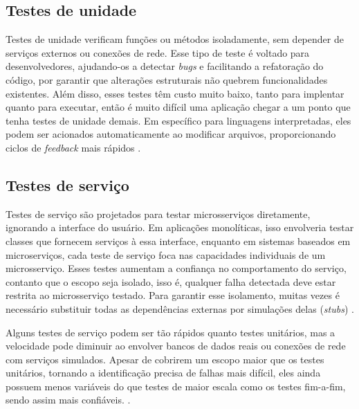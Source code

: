 
\subsection{Testes de unidade}
Testes de unidade verificam funções ou métodos isoladamente, sem depender de serviços externos ou conexões de rede. Esse tipo de teste é voltado para desenvolvedores, ajudando-os a detectar \emph{bugs} e facilitando a refatoração do código, por garantir que alterações estruturais não quebrem funcionalidades existentes. Além disso, esses testes têm custo muito baixo, tanto para implentar quanto para executar, então é muito difícil uma aplicação chegar a um ponto que tenha testes de unidade demais. Em específico para linguagens interpretadas, eles podem ser acionados automaticamente ao modificar arquivos, proporcionando ciclos de \emph{feedback} mais rápidos \cite{livro-building-microservices}. 

\subsection{Testes de serviço}
Testes de serviço são projetados para testar microsserviços diretamente, ignorando a interface do usuário. Em aplicações monolíticas, isso envolveria testar classes que fornecem serviços à essa interface, enquanto em sistemas baseados em microserviços, cada teste de serviço foca nas capacidades individuais de um microsserviço. Esses testes aumentam a confiança no comportamento do serviço, contanto que o escopo seja isolado, isso é, qualquer falha detectada deve estar restrita ao microsserviço testado. Para garantir esse isolamento, muitas vezes é necessário substituir todas as dependências externas por simulações delas (\emph{stubs}) \cite{livro-building-microservices}.

Alguns testes de serviço podem ser tão rápidos quanto testes unitários, mas a velocidade pode diminuir ao envolver bancos de dados reais ou conexões de rede com serviços simulados. Apesar de cobrirem um escopo maior que os testes unitários, tornando a identificação precisa de falhas mais difícil, eles ainda possuem menos variáveis do que testes de maior escala como os testes fim-a-fim, sendo assim mais confiáveis. \cite{livro-building-microservices}.

